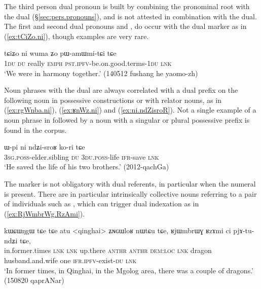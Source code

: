 The third person dual pronoun  is built by combining the pronominal root  with the dual  (§\ref{sec:pers.pronouns}), and is not attested in combination with the dual. The first and second dual pronouns  and , do occur with the dual marker as in (\ref{ex:tCiZo.ni}), though examples are very rare.

\begin{exe}
\ex \label{ex:tCiZo.ni}
\gll  tɕiʑo ni wuma ʑo pɯ-amɯmi-tɕi tɕe \\
\textsc{1du} \textsc{du} really \textsc{emph} \textsc{pst}.\textsc{ipfv}-be.on.good.terms-\textsc{1du} \textsc{lnk} \\
\glt `We were in harmony together.' (140512 fushang he yaomo-zh)
\end{exe}

Noun phrases with the dual  are always correlated with a dual prefix on the following noun in possessive constructions or with relator nouns, as in (\ref{ex:rgWnba.ni}), (\ref{ex:ʁnWz.ni}) and (\ref{ex:ni.ndZisroR}). Not a single example of a noun phrase in  followed by a noun with a singular or plural possessive prefix is found in the corpus.

\begin{exe}
\ex \label{ex:ni.ndZisroR} 
\gll ɯ-pi ni ndʑi-sroʁ ko-ri tɕe \\
\textsc{3sg}.\textsc{poss}-elder.sibling \textsc{du} \textsc{3du}.\textsc{poss}-life \textsc{ifr}-save \textsc{lnk} \\
\glt `He saved the life of his two brothers.' (2012-qachGa)
\end{exe}

The marker  is not obligatory with dual referents, in particular when the numeral  is present. 
There are in particular intrinsically collective nouns referring to a pair of individuals  such as , which can trigger dual indexation as in (\ref{ex:RjWmbrWg.RzAmi}).

\begin{exe}
\ex \label{ex:RjWmbrWg.RzAmi}
\gll  kɯɕɯŋgɯ tɕe tɕe atu <qinghai> ʑɴɢɯloʁ nɯtɕu tɕe, ʁjɯmbrɯɣ ʁzɤmi ci pjɤ-tu-ndʑi tɕe,  \\
in.former.times \textsc{lnk}  \textsc{lnk} up.there  \textsc{anthr} \textsc{anthr} \textsc{dem}:\textsc{loc} \textsc{lnk} dragon husband.and.wife one \textsc{ifr}.\textsc{ipfv}-exist-\textsc{du} \textsc{lnk} \\
\glt `In former times, in Qinghai, in the Mgolog area, there was a couple of dragons.' (150820 qaprANar)
\end{exe}

